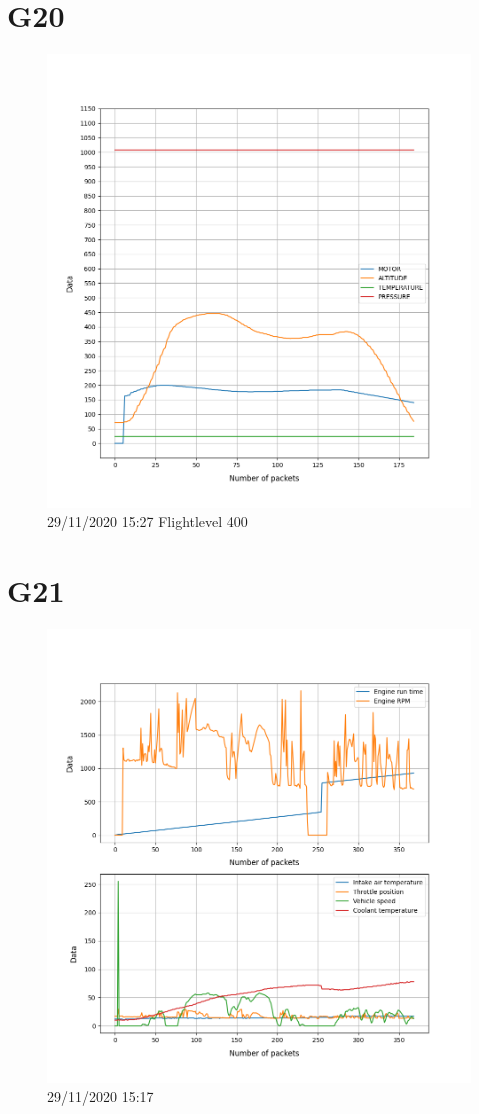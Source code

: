 \documentclass[hidelinks, 12pt, a4paper]{article}
\begin{document}
\section{G20}

\begin{figure}[h!]
\centering
	\includegraphics[height=.38\textheight, width=\textwidth]{assets/session2/g20.png}
    \caption{29/11/2020 15:27 Flightlevel 400}
\end{figure}

\section{G21}

\begin{figure}[h!]
\centering
	\includegraphics[height=.5\textheight, width=\textwidth]{assets/session2/g21.png}
    \caption{29/11/2020 15:17}
\end{figure}
\end{document}
